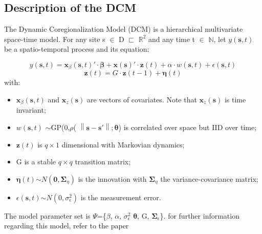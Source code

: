 \subsection{Description of the DCM}
The Dynamic Coregionalization Model (DCM) is a hierarchical multivariate space-time model.
For any site s $\in$ D $\sqsubset$ $\mathbb{R}^2$ and any time t  $\in$ $\mathbb{N}$, let $y(\pmb{s},t)$ be a spatio-temporal process and its equation:

\begin{displaymath}{
		y(\pmb{s},t) = \pmb{x}_{\beta}(\pmb{s},t)' \cdot \pmb{\beta} + \pmb{x}(\pmb{s})' \cdot \pmb{z}(t)+ \alpha \cdot w(\pmb{s},t) + \epsilon(\pmb{s},t)}
\end{displaymath}
\begin{displaymath}{
		\pmb{z}(t) = G \cdot \pmb{z}(t-1) + \pmb{\eta}(t)}
\end{displaymath}
with:
\begin{itemize}
	\item \begin{math}
		\pmb{x}_{\beta}(\pmb{s},t)
	\end{math} and \begin{math}{
		 \pmb{x}_z(\pmb{s})}
	 \end{math} are vectors of covariates. Note that \begin{math}{ 
	 	\pmb{x}_z(\pmb{s})}
 	\end{math} is time invariant;
	\item \begin{math}{
			w(\pmb{s},t)}
		\end{math}
	$\sim$GP(0,$\rho$(
	\begin{math}{ \left \| \pmb{s}-\pmb{s}' \right \|;\pmb{\theta}}
	\end{math}) is correlated over space but IID over time;
	\item \begin{math}{\pmb{z}(t)}\end{math} is $q \times 1$ dimensional with Markovian dynamics;
	\item G is a stable $q \times q$ transition matrix;
	\item \begin{math}{\pmb{\eta}(t)}\end{math}$\sim$\begin{math}{\mathit{N}(\pmb{0},\pmb{\Sigma}_\eta)}\end{math} is the innovation with \begin{math}{\pmb{\Sigma}_\eta}\end{math} the variance-covariance matrix;
	\item \begin{math}{\epsilon(\pmb{s},t)}\end{math}$\sim$\begin{math}{
			\mathit{N}(0,\sigma_\epsilon^2)}	\end{math} is the measurement error.
\end{itemize}
 The model parameter set is $\Psi$=\{\textbf{$\beta$}, $\alpha$, $\sigma_\epsilon^2$ $\pmb{\theta}$, G, $\pmb{\Sigma}_\epsilon$\}.
 for further information regarding this model, refer to the paper \cite{article}